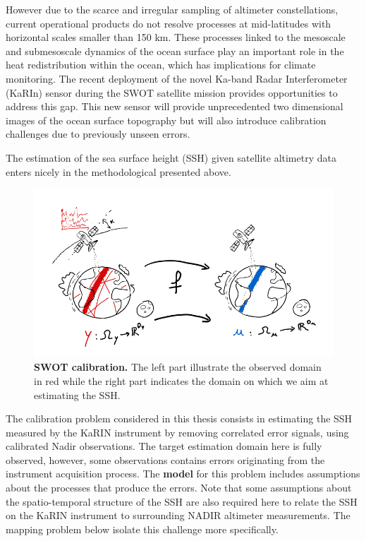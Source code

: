 \begin{bibunit}
However due to the scarce and irregular sampling of altimeter constellations, current operational products do not resolve processes at mid-latitudes with horizontal scales smaller than 150 km\cite{ballarottaResolutionsOceanAltimetry2019}.
These processes linked to the mesoscale and submesoscale dynamics of the ocean surface play an important role in the heat redistribution within the ocean, which has implications for climate monitoring.
The recent deployment of the novel Ka-band Radar Interferometer (KaRIn) sensor during the SWOT satellite mission\cite{KaRInSWOTCharacteristics} provides opportunities to address this gap.
This new sensor will provide unprecedented two dimensional images of the ocean surface topography but will also introduce calibration challenges\cite{EmpiricalCrossCalibrationCoherent} due to previously unseen errors.

The estimation of the sea surface height (SSH) given satellite altimetry data enters nicely in the methodological presented above.

  \begin{figure}
      \centering
            \includegraphics[width=\linewidth]{Introduction/pics/calib_task.png}    
      \caption{\textbf{SWOT calibration.} The left part illustrate the observed domain in red while the right part indicates the domain on which we aim at estimating the SSH.}
      \label{fig:calibration_task}
  \end{figure}
The calibration problem considered in this thesis consists in estimating the SSH measured by the KaRIN instrument by removing  correlated error signals, using calibrated Nadir observations. The target estimation domain here is fully observed, however, some observations contains errors originating from the instrument acquisition process. The \textbf{model} for this problem includes assumptions about the processes that produce the errors. Note that some assumptions about the spatio-temporal structure of the SSH are also required here to relate the SSH on the KaRIN instrument to surrounding  NADIR altimeter measurements. The mapping problem below isolate this challenge more specifically.


\end{bibunit}
